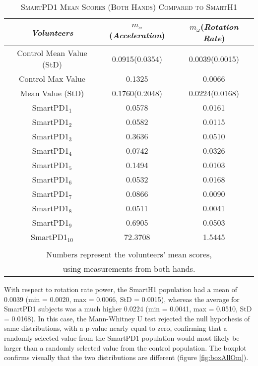 \begin{table}[!hbp]
\centering
\caption{\textsc{SmartPD1 Mean Scores (Both Hands) Compared to SmartH1}}
\begin{tabular*}{1\textwidth}{@{\extracolsep{\fill}} c  c  c}
 	\textit{Volunteers} & $m_{\alpha}$(\textit{Acceleration}) & $m_{\omega}$(\textit{Rotation Rate})\\
	\hline 	\hline 		
 	Control Mean Value (StD) & 0.0915(0.0354) & 0.0039(0.0015) \\ 
 	\hline
 	Control Max Value & 0.1325 & 0.0066 \\ 
 	\hline
 	Mean Value (StD) & 0.1760(0.2048) & 0.0224(0.0168) \\ 
 	\hline
 	\gls{SmartPD1}$_{1}$ & 0.0578 & 	0.0161 \\
 	\gls{SmartPD1}$_{2}$ & 0.0582 & 	0.0115 \\
 	\gls{SmartPD1}$_{3}$ & 0.3636 & 	0.0510 \\
 	\gls{SmartPD1}$_{4}$ & 0.0742 & 	0.0326 \\
 	\gls{SmartPD1}$_{5}$ & 0.1494 & 	0.0103 \\
 	\gls{SmartPD1}$_{6}$ & 0.0532 & 	0.0168 \\
 	\gls{SmartPD1}$_{7}$ & 0.0866 & 	0.0090 \\
 	\gls{SmartPD1}$_{8}$ & 0.0511 & 	0.0041 \\
 	\gls{SmartPD1}$_{9}$ & 0.6905 & 	0.0503 \\
 	\gls{SmartPD1}$_{10}$ & 72.3708 &	1.5445 \\
 	 &  & \\
	\multicolumn{3}{c}{Numbers represent the volunteers' mean scores, } 	\\
	\multicolumn{3}{c}{using measurements from both hands.} \\
\end{tabular*}
\label{table:allSmartPD1}
\end{table}

With respect to rotation rate power, the \gls{SmartH1} population had a mean of 0.0039 (min = 0.0020, max = 0.0066, StD = 0.0015), whereas the average for \gls{SmartPD1} subjects was a much higher 0.0224 (min = 0.0041, max = 0.0510, StD = 0.0168). In this case, the Mann-Whitney U test rejected the null hypothesis of same distributions, with a p-value nearly equal to zero, confirming that a randomly selected value from the \gls{SmartPD1} population would most likely be larger than a randomly selected value from the control population. The boxplot confirms visually that the two distributions are different (figure \ref{fig:boxAllOm}). 

